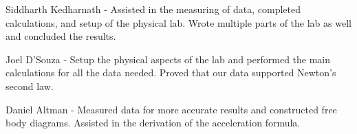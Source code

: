 ﻿\documentclass[reprint,amsmath,amssymb,aps]{revtex4-2}
\begin{document}
Siddharth Kedharnath - Assisted in the measuring of data, completed calculations, and setup of the physical lab. Wrote multiple parts of the lab as well and concluded the results.

Joel D'Souza - Setup the physical aspects of the lab and performed the main calculations for all the data needed. Proved that our data supported Newton's second law.

Daniel Altman - Measured data for more accurate results and constructed free body diagrams. Assisted in the derivation of the acceleration formula.





%

\end{document}
